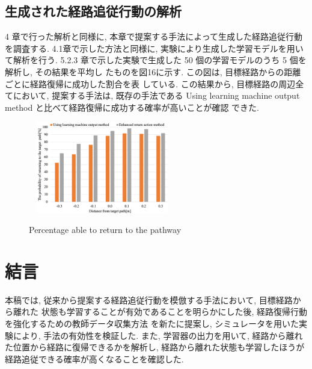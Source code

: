 \documentclass{jarticle}
\begin{document}
\subsection{生成された経路追従行動の解析}
4 章で行った解析と同様に, 本章で提案する手法によって生成した経路追従行動を調査する.
4.1章で示した方法と同様に, 実験により生成した学習モデルを用いて解析を行う.
5.2.3 章で示した実験で生成した 50 個の学習モデルのうち 5 個を解析し, その結果を平均し
たものを図16に示す. この図は, 目標経路からの距離ごとに経路復帰に成功した割合を表
している. この結果から, 目標経路の周辺全てにおいて, 提案する手法は, 既存の手法である
Using learning machine output method と比べて経路復帰に成功する確率が高いことが確認
できた.

\begin{figure}[h!]\
  \centering
   \includegraphics[height=40mm]{./figs/la2.png}
   \caption{Percentage able to return to the pathway}
\end{figure}


\section{結言}
本稿では, 従来から提案する経路追従行動を模倣する手法において, 目標経路から離れた
状態も学習することが有効であることを明らかにした後, 経路復帰行動を強化するための教師データ収集方法
を新たに提案し, シミュレータを用いた実験により, 手法の有効性を検証した.
また, 学習器の出力を用いて, 経路から離れた位置から経路に復帰できるかを解析し,
経路から離れた状態も学習したほうが経路追従できる確率が高くなることを確認した.
\vspace*{4mm}
\end{document}

